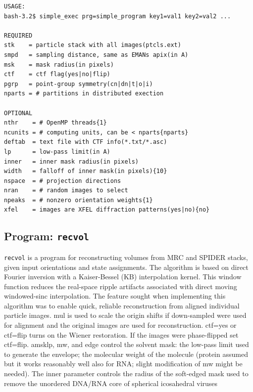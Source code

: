 \documentclass[a4paper,11pt]{article}
\newcommand{\prgname}[1]{\textcolor{NavyBlue}{\texttt{#1}}}
\begin{document}
\begin{verbatim}
USAGE:
bash-3.2$ simple_exec prg=simple_program key1=val1 key2=val2 ...

REQUIRED
stk    = particle stack with all images(ptcls.ext)
smpd   = sampling distance, same as EMANs apix(in A)
msk    = mask radius(in pixels)
ctf    = ctf flag(yes|no|flip)
pgrp   = point-group symmetry(cn|dn|t|o|i)
nparts = # partitions in distributed exection

OPTIONAL
nthr    = # OpenMP threads{1}
ncunits = # computing units, can be < nparts{nparts}
deftab  = text file with CTF info(*.txt/*.asc)
lp      = low-pass limit(in A)
inner   = inner mask radius(in pixels)
width   = falloff of inner mask(in pixels){10}
nspace  = # projection directions
nran    = # random images to select
npeaks  = # nonzero orientation weights{1}
xfel    = images are XFEL diffraction patterns(yes|no){no}
\end{verbatim}

\subsection{Program: \prgname{recvol}}
\label{recvol}
\prgname{recvol} is a program for reconstructing volumes from MRC and SPIDER stacks, given input orientations and state assignments. The algorithm is based on direct Fourier inversion with a Kaiser-Bessel (KB) interpolation kernel. This window function reduces the real-space ripple artifacts associated with direct moving windowed-sinc interpolation. The feature sought when implementing this algorithm was to enable quick, reliable reconstruction from aligned individual particle images. mul is used to scale the origin shifts if down-sampled were used for alignment and the original images are used for reconstruction. ctf=yes or ctf=flip turns on the Wiener restoration. If the images were phase-flipped set ctf=flip. amsklp, mw, and edge control the solvent mask: the low-pass limit used to generate the envelope; the molecular weight of the molecule (protein assumed but it works reasonably well also for RNA; slight modification of mw might be needed). The inner parameter controls the radius of the soft-edged mask used to remove the unordered DNA/RNA core of spherical icosahedral viruses
\end{document}
